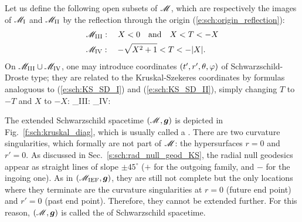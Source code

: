 Let us define the following open subsets of $\mathscr{M}$, which are respectively
the images of $\mathscr{M}_{\rm I}$ and $\mathscr{M}_{\rm II}$ by the reflection through the origin
(\ref{e:sch:origin_reflection}):
\begin{subequations}
\begin{align}
 & \mathscr{M}_{\rm III}: \quad X < 0 \quad\mbox{and}\quad X < T < -X \\
 & \mathscr{M}_{\rm IV}: \quad - \sqrt{X^2+1} < T < -|X| .
\end{align}
\end{subequations}
On $\mathscr{M}_{\rm III}\cup \mathscr{M}_{\rm IV}$, one may introduce coordinates
$(t',r',\theta,\varphi)$ of Schwarzschild-Droste type; they are related to
the Kruskal-Szekeres coordinates by formulas analoguous to
(\ref{e:sch:KS_SD_I}) and (\ref{e:sch:KS_SD_II}), simply changing $T$ to $-T$
and $X$ to $-X$:
\be \label{e:sch:KS_SD_III}
    \M_{\rm III}: \quad {}
    \iff
\ee
\be \label{e:sch:KS_SD_IV}
    \M_{\rm IV}: \quad {}
    \iff
\ee

The extended Schwarzschild spacetime $(\mathscr{M},\bm{g})$ is depicted in
Fig.~\ref{f:sch:kruskal_diag}, which is usually called a
.
There are two curvature singularities, which formally are not part of $\mathscr{M}$:
the hypersurfaces $r=0$ and $r'=0$.
As discussed in Sec.~\ref{s:sch:rad_null_geod_KS}, the radial null
geodesics appear as straight lines of slope $\pm 45^\circ$ ($+$ for the
outgoing family, and $-$ for the ingoing one).
As in $(\mathscr{M}_{\rm IEF},\bm{g})$, they are still not complete but the only
locations where they terminate are the curvature singularities
at $r=0$ (future end point) and $r'=0$ (past end point). Therefore, they cannot
be extended further. For this reason, $(\mathscr{M},\bm{g})$ is called the
of Schwarzschild spacetime.



